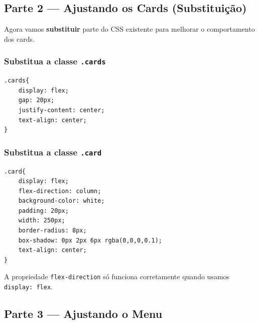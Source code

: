 \documentclass[12pt,a4paper]{article}
\begin{document}

\subsection{Parte 2 — Ajustando os Cards (Substituição)}

Agora vamos \textbf{substituir} parte do CSS existente para melhorar o comportamento dos cards.

\subsubsection{Substitua a classe \texttt{.cards}}

\begin{boxCodigo}
\begin{verbatim}
.cards{
    display: flex;
    gap: 20px;
    justify-content: center;
    text-align: center;
}
\end{verbatim}
\end{boxCodigo}

\subsubsection{Substitua a classe \texttt{.card}}

\begin{boxCodigo}
\begin{verbatim}
.card{
    display: flex;
    flex-direction: column;
    background-color: white;
    padding: 20px;
    width: 250px;
    border-radius: 8px;
    box-shadow: 0px 2px 6px rgba(0,0,0,0.1);
    text-align: center;
}
\end{verbatim}
\end{boxCodigo}

\begin{boxDica}
A propriedade \texttt{flex-direction} só funciona corretamente quando usamos \texttt{display: flex}.
\end{boxDica}


\subsection{Parte 3 — Ajustando o Menu}
\end{document}
